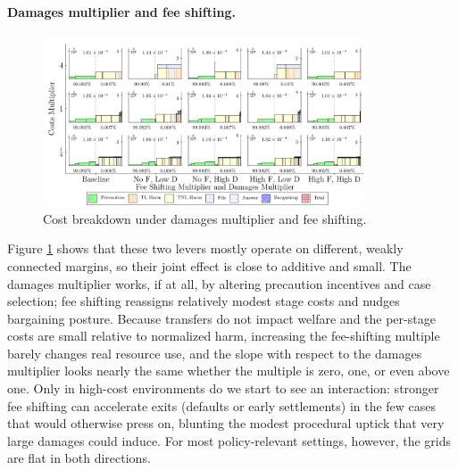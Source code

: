 \documentclass{article}
\begin{document}
\paragraph{Damages multiplier and fee shifting.}
\begin{figure}[ht]
  \centering
  \includegraphics[width=0.85\textwidth]{../Figures/Cost Breakdown Fee Shifting Multiplier and Damages Multiplier (All Rows).pdf}
  \caption{Cost breakdown under damages multiplier and fee shifting.}
  \label{fig:dm_fee}
\end{figure}

Figure \ref{fig:dm_fee} shows that these two levers mostly operate on different, weakly connected margins, so their joint effect is close to additive and small. The damages multiplier works, if at all, by altering precaution incentives and case selection; fee shifting reassigns relatively modest stage costs and nudges bargaining posture. Because transfers do not impact welfare and the per-stage costs are small relative to normalized harm, increasing the fee-shifting multiple barely changes real resource use, and the slope with respect to the damages multiplier looks nearly the same whether the multiple is zero, one, or even above one. Only in high-cost environments do we start to see an interaction: stronger fee shifting can accelerate exits (defaults or early settlements) in the few cases that would otherwise press on, blunting the modest procedural uptick that very large damages could induce. For most policy-relevant settings, however, the grids are flat in both directions.
\end{document}

